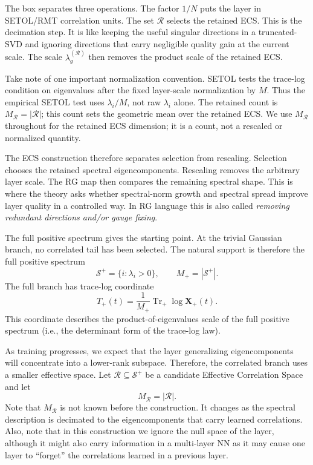 \documentclass[10pt,twocolumn]{article}
\newcommand{\Trplus}{\operatorname{Tr}_{+}}
\newcommand{\W}{\mathbf W}
\newcommand{\X}{\mathbf X}
\newcommand{\Xplus}{\mathbf X_{+}}
\newcommand{\Rell}{\mathcal R}
\newcommand{\Splus}{\mathcal S^+}
\newcommand{\Mred}{M_{\Rell}}
\begin{document}
The box separates three operations. The factor $1/N$ puts the layer in SETOL/RMT correlation units. The set $\mathcal R$ selects the retained ECS. This is the decimation step. It is like keeping the useful singular directions in a truncated-SVD and ignoring directions that carry negligible quality gain at the current scale. The scale $\lambda_g^{(\mathcal R)}$ then removes the product scale of the retained ECS.

Take note of one important normalization convention.  SETOL tests the trace-log condition on eigenvalues after the fixed layer-scale normalization by $M$.  Thus the empirical SETOL test uses $\lambda_i/M$, not raw $\lambda_i$ alone.  The retained count is $M_{\Rell}=|\mathcal R|$; this count sets the geometric mean over the retained ECS.  We use $M_{\Rell}$ throughout for the retained ECS dimension; it is a count, not a rescaled or normalized quantity.

The ECS construction therefore separates selection from rescaling. Selection chooses the retained spectral eigencomponents. Rescaling removes the arbitrary layer scale. The RG map then compares the remaining spectral shape. This is where the theory asks whether spectral-norm growth and spectral spread improve layer quality in a controlled way.  In RG language this is also called \emph{removing redundant directions and/or gauge fixing}.

The full positive spectrum gives the starting point. At the trivial Gaussian branch, no correlated tail has been selected. The natural support is therefore the full positive spectrum
\begin{equation}
\Splus=\{i:\lambda_i>0\},
\qquad
M_+=|\Splus|.
\label{eq:Splus}
\end{equation}
The full branch has trace-log coordinate
\begin{equation}
T_+(t)=\frac{1}{M_+}\Trplus\log \Xplus(t).
\label{eq:Tplus_intro}
\end{equation}
This coordinate describes the product-of-eigenvalues scale of the full positive spectrum (i.e., the determinant form of the trace-log law).

As training progresses, we expect that the layer generalizing eigencomponents will concentrate into a lower-rank subspace.
Therefore, the correlated branch uses a smaller effective space. Let $\Rell\subseteq\Splus$ be a candidate Effective Correlation Space and let
\begin{equation}
\Mred=|\Rell| .
\label{eq:mreddef}
\end{equation}
Note that $\Mred$ is not known before the construction. It changes as the spectral description is decimated to the eigencomponents that carry learned correlations.
Also, note that in this construction we ignore the null space of the layer, although it might also carry information in a multi-layer NN as it may cause one layer
to ``forget'' the correlations learned in a previous layer.
\end{document}
